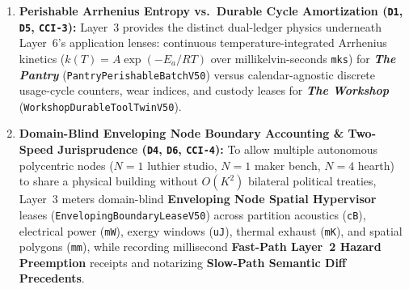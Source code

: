 \begin{enumerate}
    \item \textbf{Perishable Arrhenius Entropy vs.\ Durable Cycle Amortization (\texttt{D1}, \texttt{D5}, \texttt{CCI-3}):} Layer~3 provides the distinct dual-ledger physics underneath Layer~6's application lenses: continuous temperature-integrated Arrhenius kinetics ($k(T) = A\exp(-E_a/RT)$ over millikelvin-seconds \texttt{mks}) for \textbf{\textit{The Pantry}} (\texttt{PantryPerishableBatchV50}) versus calendar-agnostic discrete usage-cycle counters, wear indices, and custody leases for \textbf{\textit{The Workshop}} (\texttt{WorkshopDurableToolTwinV50}).
    \item \textbf{Domain-Blind Enveloping Node Boundary Accounting \& Two-Speed Jurisprudence (\texttt{D4}, \texttt{D6}, \texttt{CCI-4}):} To allow multiple autonomous polycentric nodes ($N=1$ luthier studio, $N=1$ maker bench, $N=4$ hearth) to share a physical building without $O(K^2)$ bilateral political treaties, Layer~3 meters domain-blind \textbf{Enveloping Node Spatial Hypervisor} leases (\texttt{EnvelopingBoundaryLeaseV50}) across partition acoustics (\texttt{cB}), electrical power (\texttt{mW}), exergy windows (\texttt{uJ}), thermal exhaust (\texttt{mK}), and spatial polygons (\texttt{mm}), while recording millisecond \textbf{Fast-Path Layer~2 Hazard Preemption} receipts and notarizing \textbf{Slow-Path Semantic Diff Precedents}.
\end{enumerate}

